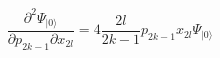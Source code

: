 \begin{equation}\frac{\partial^2
\Psi_{|0\rangle}}{\partial p_{2k-1}\partial x_{2l}}=4 \frac{
2l}{2k-1} p_{2k-1}x_{2l}\Psi_{|0\rangle}\nonumber
\end{equation}

